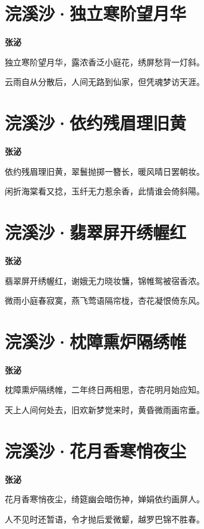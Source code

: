 \documentclass[12pt,a4paper]{ctexbook}
\begin{document}
\section{浣溪沙·独立寒阶望月华}
\textbf{张泌}\par\vspace{0.5em}
独立寒阶望月华，露浓香泛小庭花，绣屏愁背一灯斜。\par
云雨自从分散后，人间无路到仙家，但凭魂梦访天涯。\par

\section{浣溪沙·依约残眉理旧黄}
\textbf{张泌}\par\vspace{0.5em}
依约残眉理旧黄，翠鬟抛掷一簪长，暖风晴日罢朝妆。\par
闲折海棠看又捻，玉纤无力惹余香，此情谁会倚斜陽。\par

\section{浣溪沙·翡翠屏开绣幄红}
\textbf{张泌}\par\vspace{0.5em}
翡翠屏开绣幄红，谢娥无力晓妆慵，锦帷鸳被宿香浓。\par
微雨小庭春寂寞，燕飞莺语隔帘栊，杏花凝恨倚东风。\par

\section{浣溪沙·枕障熏炉隔绣帷}
\textbf{张泌}\par\vspace{0.5em}
枕障熏炉隔绣帷，二年终日两相思，杏花明月始应知。\par
天上人间何处去，旧欢新梦觉来时，黄昏微雨画帘垂。\par

\section{浣溪沙·花月香寒悄夜尘}
\textbf{张泌}\par\vspace{0.5em}
花月香寒悄夜尘，绮筵幽会暗伤神，婵娟依约画屏人。\par
人不见时还暂语，令才抛后爱微颦，越罗巴锦不胜春。\par
\end{document}
